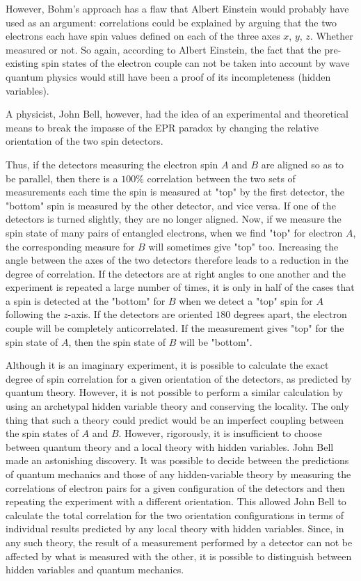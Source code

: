 	However, Bohm's approach has a flaw that Albert Einstein would probably have used as an argument: correlations could be explained by arguing that the two electrons each have spin values defined on each of the three axes $x$, $y$, $z$. Whether measured or not. So again, according to Albert Einstein, the fact that the pre-existing spin states of the electron couple can not be taken into account by wave quantum physics would still have been a proof of its incompleteness (hidden variables).
	
	A physicist, John Bell, however, had the idea of an experimental and theoretical means to break the impasse of the EPR paradox by changing the relative orientation of the two spin detectors.

	Thus, if the detectors measuring the electron spin $A$ and $B$ are aligned so as to be parallel, then there is a $100\%$ correlation between the two sets of measurements each time the spin is measured at "top" by the first detector, the "bottom" spin is measured by the other detector, and vice versa. If one of the detectors is turned slightly, they are no longer aligned. Now, if we measure the spin state of many pairs of entangled electrons, when we find "top" for electron $A$, the corresponding measure for $B$ will sometimes give "top" too. Increasing the angle between the axes of the two detectors therefore leads to a reduction in the degree of correlation. If the detectors are at right angles to one another and the experiment is repeated a large number of times, it is only in half of the cases that a spin is detected at the "bottom" for $B$ when we detect a "top" spin for $A$ following the $z$-axis. If the detectors are oriented $180$ degrees apart, the electron couple will be completely anticorrelated. If the measurement gives "top" for the spin state of $A$, then the spin state of $B$ will be "bottom".
	
	Although it is an imaginary experiment, it is possible to calculate the exact degree of spin correlation for a given orientation of the detectors, as predicted by quantum theory. However, it is not possible to perform a similar calculation by using an archetypal hidden variable theory and conserving the locality. The only thing that such a theory could predict would be an imperfect coupling between the spin states of $A$ and $B$. However, rigorously, it is insufficient to choose between quantum theory and a local theory with hidden variables. John Bell made an astonishing discovery. It was possible to decide between the predictions of quantum mechanics and those of any hidden-variable theory by measuring the correlations of electron pairs for a given configuration of the detectors and then repeating the experiment with a different orientation. This allowed John Bell to calculate the total correlation for the two orientation configurations in terms of individual results predicted by any local theory with hidden variables. Since, in any such theory, the result of a measurement performed by a detector can not be affected by what is measured with the other, it is possible to distinguish between hidden variables and quantum mechanics.
	
